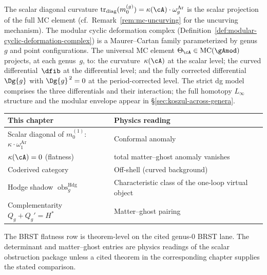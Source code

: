 The scalar diagonal curvature
$\operatorname{tr}_{\mathrm{diag}}(m_0^{(g)})
=\kappa(\cA)\cdot\omega_g^{\mathrm{Ar}}$ is the scalar projection of the full MC element
(cf.\ Remark~\ref{rem:mc-uncurving} for the
uncurving mechanism). The
modular cyclic deformation complex
(Definition~\ref{def:modular-cyclic-deformation-complex}) is a
Maurer--Cartan family parameterized by genus~$g$ and point
configurations. The universal MC element
$\Theta_\cA \in \mathrm{MC}(\gAmod)$ projects, at each genus~$g$, to:
the curvature~$\kappa(\cA)$ at the scalar level; the curved
differential~$\dfib$ at the differential level; and the
fully corrected differential~$\Dg{g}$ with $\Dg{g}^{\,2}=0$ at
the period-corrected level. The strict dg model
comprises the three differentials and their interaction; the full homotopy
$L_\infty$ structure and the modular envelope appear in
\S\ref{sec:koszul-across-genera}.

\begin{remark}\label{rem:anomaly-parallel-track}
\begin{center}
\small
\begin{tabular}{ll}
\textbf{This chapter} & \textbf{Physics reading} \\ \hline
Scalar diagonal of $m_0^{(1)}$: $\kappa \cdot \omega_1^{\mathrm{Ar}}$ & Conformal anomaly \\
$\kappa(\cA) = 0$ (flatness) & total matter--ghost anomaly vanishes \\
Coderived category & Off-shell (curved background) \\
Hodge shadow $\operatorname{obs}^{\mathrm{Hdg}}_g$
& Characteristic class of the one-loop virtual object \\
Complementarity $Q_g + Q_g' = H^*$ & Matter--ghost pairing
\end{tabular}
\end{center}
The BRST flatness row is theorem-level on the cited genus-$0$ BRST
lane. The determinant and matter--ghost entries are physics readings
of the scalar obstruction package unless a cited theorem in the
corresponding chapter supplies the stated comparison.
\end{remark}

